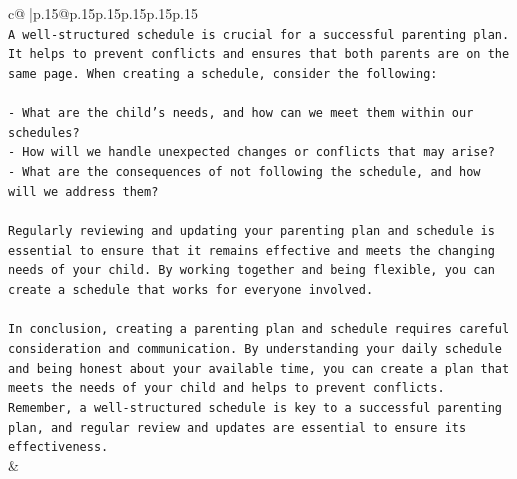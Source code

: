 \documentclass{article}
\begin{document}
{\begin{supertabular}{c@{$\;$}|p{.15\linewidth}@{}p{.15\linewidth}p{.15\linewidth}p{.15\linewidth}p{.15\linewidth}p{.15\linewidth}}
{{{\\ 
\texttt{A well{-}structured schedule is crucial for a successful parenting plan. It helps to prevent conflicts and ensures that both parents are on the same page. When creating a schedule, consider the following:} \\
\\ 
\texttt{{-} What are the child's needs, and how can we meet them within our schedules?} \\
\texttt{{-} How will we handle unexpected changes or conflicts that may arise?} \\
\texttt{{-} What are the consequences of not following the schedule, and how will we address them?} \\
\\ 
\texttt{Regularly reviewing and updating your parenting plan and schedule is essential to ensure that it remains effective and meets the changing needs of your child. By working together and being flexible, you can create a schedule that works for everyone involved.} \\
\\ 
\texttt{In conclusion, creating a parenting plan and schedule requires careful consideration and communication. By understanding your daily schedule and being honest about your available time, you can create a plan that meets the needs of your child and helps to prevent conflicts. Remember, a well{-}structured schedule is key to a successful parenting plan, and regular review and updates are essential to ensure its effectiveness.} \\
            }
        }
    }
    & \\ \\


\end{supertabular}}
\end{document}
